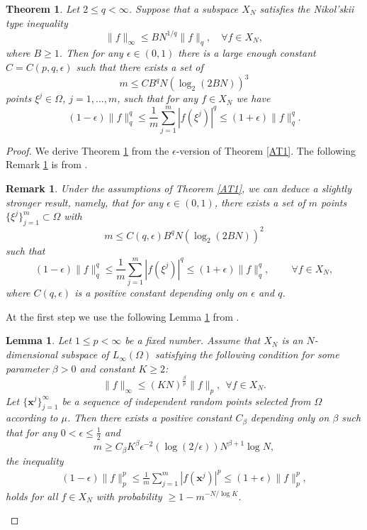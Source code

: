 \documentclass[12pt]{article}
\def\Og{\Omega}
\def \ep{\epsilon}
\def\bx{\mathbf x}
\def\Og{\Omega}
\newtheorem{Theorem}{Theorem}[section]
\newtheorem{Lemma}{Lemma}[section]
\newtheorem{Remark}{Remark}[section]
\numberwithin{equation}{section}
\newcommand{\be}{\begin{equation}}
\newcommand{\ee}{\end{equation}}
\begin{document}
\begin{Theorem}\label{AT2} Let $2\le q<\infty$. Suppose that a subspace $X_N$ satisfies the Nikol'skii type inequality
\be\label{A3}
\|f\|_\infty \le  B N^{1/q}\|f\|_q, \quad \forall f\in X_N,
\ee
where $B\ge 1 $.
Then for any $\ep\in(0,1)$ there is a large enough constant $C=C(p, q,\ep)$ such that there exists a set of
\begin{equation}\label{A2.4}
m \le C B^{q}N(\log_2 (2BN))^3 
\end{equation}
points $\xi^j\in \Omega$, $j=1,\dots,m$,   such that for any $f\in X_N$
we have
$$
(1-\ep)\|f\|_q^q \le \frac{1}{m}\sum_{j=1}^m |f(\xi^j)|^q \le (1+\ep)\|f\|_q^q.
$$
\end{Theorem}
\begin{proof} We derive Theorem \ref{AT2} from the $\ep$-version of Theorem \ref{AT1}. 
The following Remark \ref{AR1} is from \cite{DPSTT1}.
\begin{Remark}\label{AR1}
Under the assumptions of Theorem \ref{AT1},  we can deduce a slightly stronger result, namely,   that  for any $\epsilon\in (0,1)$,  there exists a set of $m$ points $\{\xi^j\}_{j=1}^m\subset \Omega$ with
$$
m \le C(q,\epsilon)B^{q}N(\log_2(2BN))^2
$$
	 such that
	\begin{equation*}
	(1-\epsilon)\|f\|_q^q\le \frac{1}{m}\sum_{j=1}^m |f(\xi^j)|^q \le (1+\epsilon)\|f\|_q^q,\   \qquad \forall f\in X_N,
	\end{equation*}
where  $C(q, \epsilon)$ is a positive constant  depending  only on $\epsilon$ and $q$.	
 \end{Remark}

At the first step we use the following Lemma \ref{AL1} from \cite{DPSTT2}. 

\begin{Lemma}\label{AL1} Let $1\leq p<\infty$  be a fixed number. Assume that   $X_N$ is  an $N$-dimensional subspace of $L_\infty(\Og)$ satisfying  the following condition  for  some  parameter $\beta >0$ and constant $K\ge 2$:
	\begin{equation}\label{A4}
	\|f\|_\infty \leq (KN)^{\frac{\beta}{p}} \|f\|_p,\   \   \forall f\in X_N.
	\end{equation}
	Let $\{\bx^j\}_{j=1}^\infty$ be a sequence of independent random points  selected   from $\Omega$ according to $\mu$.
	Then   there exists a  positive   constant  $C_\beta$  depending only on $\beta$  such that for any   $0< \ep\leq \frac 12$ and    \begin{equation}\label{A5}
	m\ge C_\beta K^\beta \ep^{-2}( \log( 2/\ep)) N^{\beta+1}\log N, 
	\end{equation}  
	the   inequality
	\begin{align}
(1-\ep) \|f\|_p^p\leq  \frac{ 1}{m} \sum_{j=1}^m| f(\bx^j)|^p \leq (1+\ep)\|f\|_p^p,
	\end{align}
	holds for all $f\in X_N$  with probability
	$ \ge 1-m^{-N/\log K}$.
	

\end{Lemma}
\end{proof}
\end{document}
